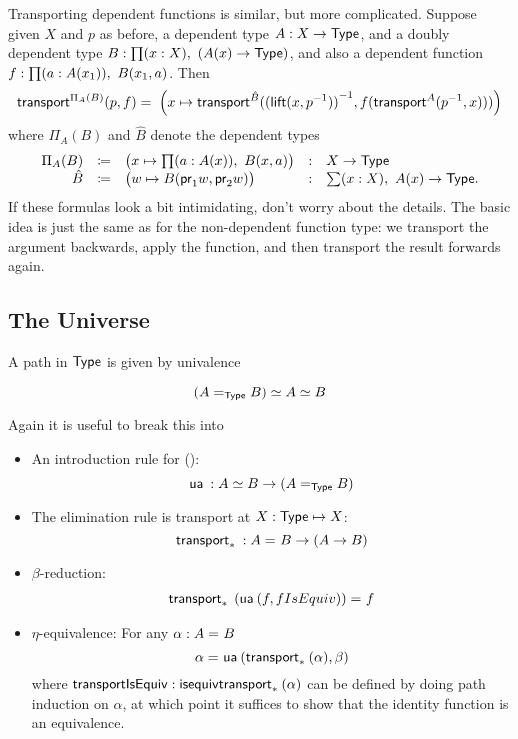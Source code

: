 Transporting dependent functions is similar, but more complicated.
Suppose given $X$ and $p$ as before, a dependent type $A:X\to \type$, and a doubly dependent type $B:\prd{x:X} (A(x)\to\type)$, and also a dependent function $f : \prd{a:A(x_1)} B(x_1,a)$.
Then
\begin{align*}
  \transfib{\Pi_A(B)}{p}{f} =
  \;\Big(x \mapsto \transfib{\hat{B}}{\opp{(\mathsf{lift}(x,\opp{p}))}}{f (\transfib{A}{\opp p}x)}\Big)
\end{align*}
where $\Pi_A(B)$ and $\hat{B}$ denote the dependent types
\[
\begin{array}{rclcl}
\Pi_A(B) &\defeq& \big(x\mapsto \prd{a:A(x)} B(x,a) \big) &:& X\to \type\\
\hat{B} &\defeq& \big(w \mapsto B(\proj1w,\proj2w) \big) &:& \sm{x:X} A(x) \to \type.
\end{array}
\]
If these formulas look a bit intimidating, don't worry about the details.
The basic idea is just the same as for the non-dependent function type: we transport the argument backwards, apply the function, and then transport the result forwards again.


\subsection{The Universe}
\label{sec:compute-universe}

A path in $\type$ is given by univalence

\[
\eqv{(\id[\type]{A}{B})}{\eqv A B}
\]

Again it is useful to break this into 

\begin{itemize}
\item An introduction rule for {()}:
  \[
  \ua{} : {\eqv A B} \to (\id[\type]{A}{B})
  \]
\item The elimination rule is transport at $X:\type \mapsto X$:
  \[
  \transport{X \mapsto X}{} : \id{A}{B} \to (A \to B)
  \]
\item $\beta$-reduction: 
  \[
  \begin{array}{l}
  \id{\transport{X \mapsto X} \: (\ua {(f, fIsEquiv)})}{f}
  \end{array}
  \]
\item $\eta$-equivalence: For any $\alpha : \id A B$
  \[
  \id{\alpha}{\ua {(\transport{X \mapsto X}(\alpha) , \beta)}}
  \]
  where $\mathsf{transportIsEquiv} : \isequiv{\transport{X \mapsto X}(\alpha)}$ can be
  defined by doing path induction on $\alpha$, at which point it
  suffices to show that the identity function is an equivalence.  
\end{itemize}

